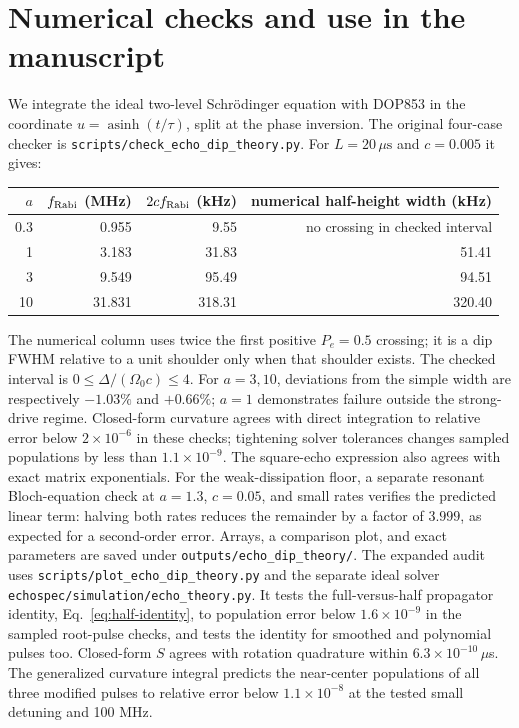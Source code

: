 \documentclass[11pt]{article}
\newcommand{\Pe}{P_e}
\newcommand{\Om}{\Omega}
\begin{document}
\section{Numerical checks and use in the manuscript}
We integrate the ideal two-level Schr\"odinger equation with DOP853 in
the coordinate $u=\operatorname{asinh}(t/\tau)$, split at the phase inversion.
The original four-case checker is
\nolinkurl{scripts/check_echo_dip_theory.py}.
For $L=20\,\mu\mathrm{s}$ and $c=0.005$ it gives:
\begin{center}
\begin{tabular}{rrrr}
\toprule
$a$ & $f_{\rm Rabi}$ (MHz) & $2c f_{\rm Rabi}$ (kHz)
 & numerical half-height width (kHz)\\
\midrule
0.3 & 0.955 & 9.55 & no crossing in checked interval\\
1 & 3.183 & 31.83 & 51.41\\
3 & 9.549 & 95.49 & 94.51\\
10 & 31.831 & 318.31 & 320.40\\
\bottomrule
\end{tabular}
\end{center}
The numerical column uses twice the first positive $\Pe=0.5$ crossing;
it is a dip FWHM relative to a unit shoulder only when that shoulder exists.
The checked interval is $0\le\Delta/(\Om_0c)\le4$.
For $a=3,10$, deviations from the simple width are respectively $-1.03\%$
and $+0.66\%$; $a=1$ demonstrates failure outside the strong-drive regime.
Closed-form curvature agrees with direct integration to relative error below
$2\times10^{-6}$ in these checks; tightening solver tolerances changes
sampled populations by less than $1.1\times10^{-9}$.
The square-echo expression also agrees with exact matrix exponentials.
For the weak-dissipation floor, a separate resonant Bloch-equation check
at $a=1.3$, $c=0.05$, and small rates verifies the predicted linear term:
halving both rates reduces the remainder by a factor of $3.999$, as
expected for a second-order error. Arrays, a comparison plot, and exact
parameters are saved under \nolinkurl{outputs/echo_dip_theory/}.
The expanded audit uses \nolinkurl{scripts/plot_echo_dip_theory.py}
and the separate ideal solver \nolinkurl{echospec/simulation/echo_theory.py}.
It tests the full-versus-half propagator identity, Eq.~\eqref{eq:half-identity},
to population error below $1.6\times10^{-9}$ in the sampled root-pulse
checks, and tests the identity for smoothed and polynomial pulses too.
Closed-form $S$ agrees with rotation quadrature within
$6.3\times10^{-10}\,\mu$s. The generalized curvature integral predicts
the near-center populations of all three modified pulses to relative error
below $1.1\times10^{-8}$ at the tested small detuning and 100 MHz.
\end{document}

